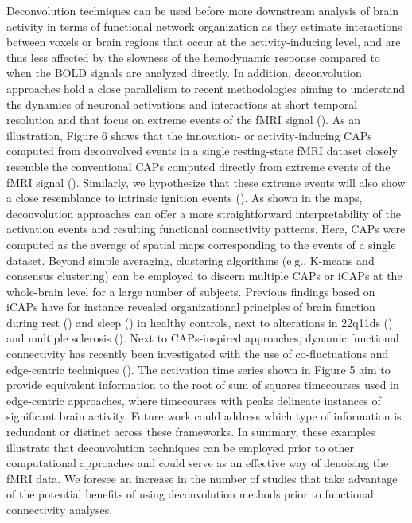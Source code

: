 Deconvolution techniques can be used before more downstream analysis of brain activity in terms of functional network organization as they estimate interactions between voxels or brain regions that occur at the activity-inducing level, and are thus less affected by the slowness of the hemodynamic response compared to when the BOLD signals are analyzed directly. In addition, deconvolution approaches hold a close parallelism to recent methodologies aiming to understand the dynamics of neuronal activations and interactions at short temporal resolution and that focus on extreme events of the fMRI signal (\citealt{Lindquist_2007}). As an illustration, Figure 6 shows that the innovation- or activity-inducing CAPs computed from deconvolved events in a single resting-state fMRI dataset closely resemble the conventional CAPs computed directly from extreme events of the fMRI signal (\citealt{Liu2013Timevaryingfunctional,Liu2013Decompositionspontaneousbrain,Liu2018Coactivationpatterns,cifre2020revisiting,Cifre2020Furtherresultswhy,Zhang2020relationshipBOLDneural,Tagliazucchi2011,Tagliazucchi2012,Tagliazucchi2016,Rolls2021}). Similarly, we hypothesize that these extreme events will also show a close resemblance to intrinsic ignition events (\citealt{Deco2017a,Deco2017}). As shown in the maps, deconvolution approaches can offer a more straightforward interpretability of the activation events and resulting functional connectivity patterns. Here, CAPs were computed as the average of spatial maps corresponding to the events of a single dataset. Beyond simple averaging, clustering algorithms (e.g., K-means and consensus clustering) can be employed to discern multiple CAPs or iCAPs at the whole-brain level for a large number of subjects. Previous findings based on iCAPs have for instance revealed organizational principles of brain function during rest (\citealt{Karahanoglu2015Transientbrainactivity}) and sleep (\citealt{tarun2101}) in healthy controls, next to alterations in 22q11ds (\citealt{zoller1902}) and multiple sclerosis (\citealt{bommarito2101p}). Next to CAPs-inspired approaches, dynamic functional connectivity has recently been investigated with the use of co-fluctuations and edge-centric techniques (\citealt{Faskowitz2020,Esfahlani2020Highamplitudecofluctuations,Jo2021,Sporns2021,Oort2018}). The activation time series shown in Figure 5 aim to provide equivalent information to the root of sum of squares timecourses used in edge-centric approaches, where timecourses with peaks delineate instances of significant brain activity. Future work could address which type of information is redundant or distinct across these frameworks. In summary, these examples illustrate that deconvolution techniques can be employed prior to other computational approaches and could serve as an effective way of denoising the fMRI data. We foresee an increase in the number of studies that take advantage of the potential benefits of using deconvolution methods prior to functional connectivity analyses.

